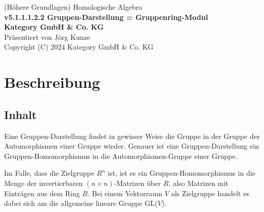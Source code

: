 \documentclass[a4paper]{amsart}
\theoremstyle{definition}
\begin{document}
\begin{titlepage}
\centering
{\huge
(Höhere Grundlagen) Homologische Algebra\\[1cm]
\textbf{v5.1.1.1.2.2 Gruppen-Darstellung = Gruppenring-Modul}
}\\[1cm]

\textbf{Kategory GmbH \& Co. KG}\\
Präsentiert von Jörg Kunze\\
Copyright (C) 2024 Kategory GmbH \& Co. KG

\end{titlepage}

%

\newpage

\section*{Beschreibung}

\subsection*{Inhalt}
Eine Gruppen-Darstellung findet in gewisser Weise die Gruppe in der Gruppe der Automorphismen einer Gruppe wieder. Genauer ist eine Gruppen-Darstellung ein Gruppen-Homomorphismus in die Automorphismen-Gruppe einer Gruppe.

Im Falle, dass die Zielgruppe $R^n$ ist, ist es ein Gruppen-Homomorphismus in die Menge der invertierbaren $(n \times n)$-Matrizen über $R$, also Matrizen mit Einträgen aus dem Ring $R$. Bei einem Vektorraum $V$ als Zielgruppe handelt es dabei sich am die allgemeine lineare Gruppe GL($V$).
\end{document}
